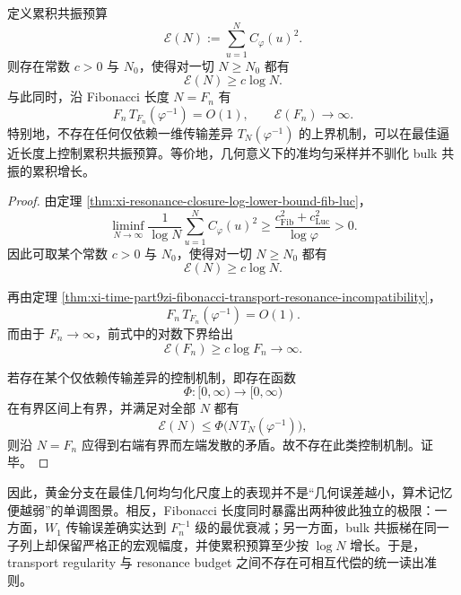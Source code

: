 \begin{corollary}[传输正则性不能约束共振预算]\label{cor:xi-time-part9zi-transport-regularity-cannot-bound-resonance-budget}
定义累积共振预算
\[
\mathcal E(N):=\sum_{u=1}^{N}C_\varphi(u)^2.
\]
则存在常数 \(c>0\) 与 \(N_0\)，使得对一切 \(N\ge N_0\) 都有
\[
\mathcal E(N)\ge c\log N.
\]
与此同时，沿 Fibonacci 长度 \(N=F_n\) 有
\[
F_n\,T_{F_n}(\varphi^{-1})=O(1),
\qquad
\mathcal E(F_n)\longrightarrow\infty.
\]
特别地，不存在任何仅依赖一维传输差异 \(T_N(\varphi^{-1})\) 的上界机制，可以在最佳逼近长度上控制累积共振预算。等价地，几何意义下的准均匀采样并不驯化 bulk 共振的累积增长。
\end{corollary}
\begin{proof}
由定理 \ref{thm:xi-resonance-closure-log-lower-bound-fib-luc}，
\[
\liminf_{N\to\infty}
\frac{1}{\log N}\sum_{u=1}^{N}C_\varphi(u)^2
\ge
\frac{c_{\mathrm{Fib}}^2+c_{\mathrm{Luc}}^2}{\log\varphi}>0.
\]
因此可取某个常数 \(c>0\) 与 \(N_0\)，使得对一切 \(N\ge N_0\) 都有
\[
\mathcal E(N)\ge c\log N.
\]

再由定理 \ref{thm:xi-time-part9zi-fibonacci-transport-resonance-incompatibility}，
\[
F_n\,T_{F_n}(\varphi^{-1})=O(1).
\]
而由于 \(F_n\to\infty\)，前式中的对数下界给出
\[
\mathcal E(F_n)\ge c\log F_n\longrightarrow\infty.
\]

若存在某个仅依赖传输差异的控制机制，即存在函数
\[
\Phi:[0,\infty)\to[0,\infty)
\]
在有界区间上有界，并满足对全部 \(N\) 都有
\[
\mathcal E(N)\le \Phi\!\bigl(N\,T_N(\varphi^{-1})\bigr),
\]
则沿 \(N=F_n\) 应得到右端有界而左端发散的矛盾。故不存在此类控制机制。证毕。
\end{proof}

\noindent
因此，黄金分支在最佳几何均匀化尺度上的表现并不是“几何误差越小，算术记忆便越弱”的单调图景。相反，Fibonacci 长度同时暴露出两种彼此独立的极限：一方面，\(W_1\) 传输误差确实达到 \(F_n^{-1}\) 级的最优衰减；另一方面，bulk 共振梯在同一子列上却保留严格正的宏观幅度，并使累积预算至少按 \(\log N\) 增长。于是，transport regularity 与 resonance budget 之间不存在可相互代偿的统一读出准则。

\endinput
